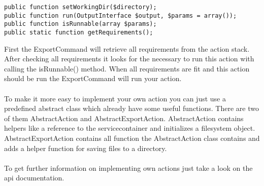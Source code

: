 \begin{verbatim}
public function setWorkingDir($directory);
public function run(OutputInterface $output, $params = array());
public function isRunnable(array $params);
public static function getRequirements();
\end{verbatim}

\noindent
First the ExportCommand will retrieve all requirements from the action stack. After checking all requirements it looks for the necessary to run this action with calling the isRunnable() method. When all requirements are fit and this action should be run the ExportCommand will run your action.\\
\\
To make it more easy to implement your own action you can just use a predefined abstract class which already have some useful functions. There are two of them AbstractAction and AbstractExportAction. AbstractAction contains helpers like a reference to the servicecontainer and initializes a filesystem object. AbstractExportAction contains all function the AbstractAction class contains and adds a helper function for saving files to a directory. \\
\\
To get further information on implementing own actions just take a look on the api documentation.\\